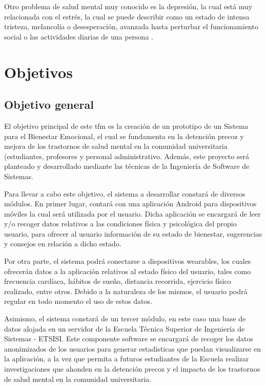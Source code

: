 Otro problema de salud mental muy conocido es la depresión, la cual está muy relacionada con el estrés, la cual se puede describir como un estado de intensa tristeza, melancolía o desesperación, avanzada hasta perturbar el funcionamiento social o las actividades diarias de una persona \cite{van_neerven_rarrxr_2008}. 

\section{Objetivos}
    \label{sec:objetivos}

    \subsection{Objetivo general}

        El objetivo principal de este \gls{tfm} es la creación de un prototipo de un Sistema para el Bienestar Emocional, el cual se fundamenta en la detención precoz y mejora de los trastornos de salud mental en la comunidad universitaria (estudiantes, profesores y personal administrativo.  Además, este proyecto será planteado y desarrollado mediante las técnicas de la Ingeniería de Software de Sistemas.
    
        Para llevar a cabo este objetivo, el sistema a desarrollar constará de diversos módulos. En primer lugar, contará con una aplicación Android para dispositivos móviles la cual será utilizada por el usuario. Dicha aplicación se encargará de leer y/o recoger datos relativos a las condiciones física y psicológica del propio usuario, para ofrecer al usuario información de su estado de bienestar, sugerencias y consejos en relación a dicho estado.
    
        Por otra parte, el sistema podrá conectarse a dispositivos \glspl{wearable}, los cuales ofrecerán datos a la aplicación relativos al estado físico del usuario, tales como frecuencia cardíaca, hábitos de sueño, distancia recorrida, ejercicio físico realizado, entre otros. 
        Debido a la naturaleza de los mismos, el usuario podrá regular en todo momento el uso de estos datos.
    
        Asimismo, el sistema constará de un tercer módulo, en este caso una base de datos alojada en un servidor de la Escuela Técnica Superior de Ingeniería de Sistemas - ETSISI. Este componente software se encargará de recoger los datos anonimizados de los usuarios para generar estadísticas que puedan visualizarse en la aplicación, a la vez que permita a futuros estudiantes de la Escuela realizar investigaciones que ahonden en la detención precoz y el impacto de los trastornos de salud mental en la comunidad universitaria.

